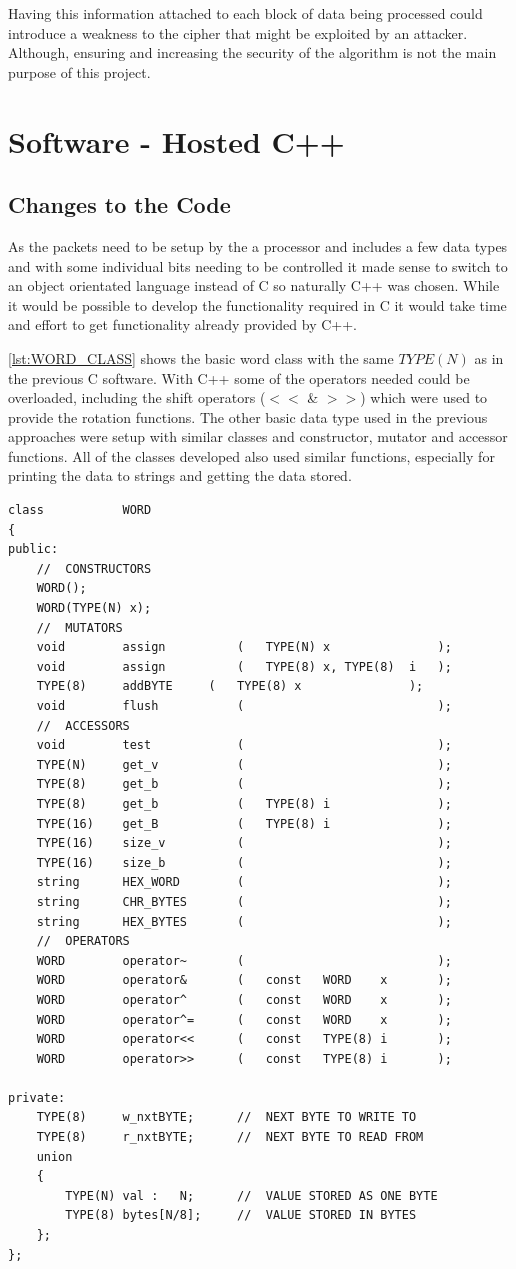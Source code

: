 \documentclass[12pt,twoside,a4paper]{report}
\begin{document}
	Having this information attached to each block of data being processed could introduce a weakness to the cipher that might be exploited by an attacker. Although, ensuring and increasing the security of the algorithm is not the main purpose of this project.
    
	\section{Software - Hosted C++}
	\label{section:HOSTEDF}
	
	\subsection{Changes to the Code}
	
	As the packets need to be setup by the a processor and includes a few data types and with some individual bits needing to be controlled it made sense to switch to an object orientated language instead of C so naturally C++ was chosen. While it would be possible to develop the functionality required in C it would take time and effort to get functionality already provided by C++.
	
	\autoref{lst:WORD_CLASS} shows the basic word class with the same $TYPE(N)$ as in the previous C software. With C++ some of the operators needed could be overloaded, including the shift operators ($<<$ \& $>>$) which were used to provide the rotation functions. The other basic data type used in the previous approaches were setup with similar classes and constructor, mutator and accessor functions. All of the classes developed also used similar functions, especially for printing the data to strings and getting the data stored.

	\begin{lstlisting}[label={lst:WORD_CLASS},caption={Declaration of WORD Class},style=CStyle]
class 			WORD
{
public:
	//	CONSTRUCTORS
	WORD();
	WORD(TYPE(N) x);
	//	MUTATORS
	void	 	assign			(	TYPE(N)	x				);
	void     	assign			(	TYPE(8)	x, TYPE(8)	i	);
	TYPE(8)	 	addBYTE		(	TYPE(8)	x				);
	void	 	flush			(							);
	//	ACCESSORS
	void	 	test			(							);
	TYPE(N)	 	get_v			(							);
	TYPE(8)	 	get_b			(							);
	TYPE(8)	 	get_b			(	TYPE(8)	i				);
	TYPE(16) 	get_B			(	TYPE(8)	i				);
	TYPE(16) 	size_v			(							);
	TYPE(16) 	size_b			(							);
	string	 	HEX_WORD		(							);
	string	 	CHR_BYTES		(							);
	string	 	HEX_BYTES		(							);
	//	OPERATORS
	WORD		operator~		(							);
	WORD		operator&		(	const	WORD	x		);
	WORD		operator^		(	const	WORD	x		);
	WORD		operator^=		(	const	WORD	x		);
	WORD		operator<<		(	const	TYPE(8)	i		);
	WORD		operator>>		(	const	TYPE(8)	i		);
	
private:
	TYPE(8)		w_nxtBYTE;		//	NEXT BYTE TO WRITE TO
	TYPE(8)		r_nxtBYTE;		//	NEXT BYTE TO READ FROM
	union
	{
		TYPE(N)	val	:	N;		//	VALUE STORED AS ONE BYTE
		TYPE(8)	bytes[N/8];		//	VALUE STORED IN BYTES
	};
};
	\end{lstlisting}
    
\end{document}
